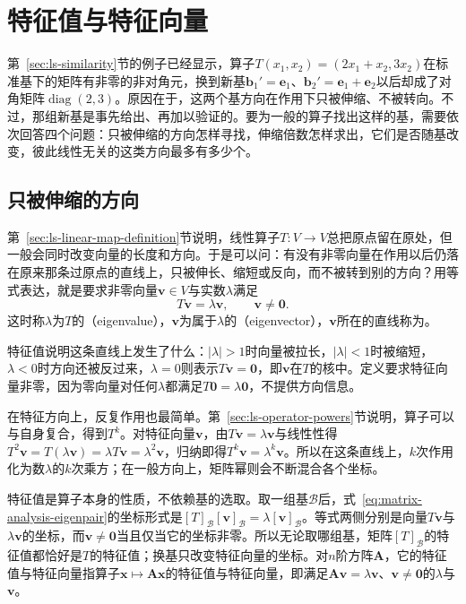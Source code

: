
\section{特征值与特征向量}
\label{sec:ls-linear-operators}

第~\ref{sec:ls-similarity}节的例子已经显示，算子$T(x_1,x_2)=(2x_1+x_2,3x_2)$在标准基下的矩阵有非零的非对角元，换到新基$\bm b_1'=\bm e_1$、$\bm b_2'=\bm e_1+\bm e_2$以后却成了对角矩阵$\operatorname{diag}(2,3)$。原因在于，这两个基方向在作用下只被伸缩、不被转向。不过，那组新基是事先给出、再加以验证的。要为一般的算子找出这样的基，需要依次回答四个问题：只被伸缩的方向怎样寻找，伸缩倍数怎样求出，它们是否随基改变，彼此线性无关的这类方向最多有多少个。

\subsection{只被伸缩的方向}
\label{sec:ls-operator-eigenvectors}

第~\ref{sec:ls-linear-map-definition}节说明，线性算子$T:V\to V$总把原点留在原处，但一般会同时改变向量的长度和方向。于是可以问：有没有非零向量在作用以后仍落在原来那条过原点的直线上，只被伸长、缩短或反向，而不被转到别的方向？用等式表达，就是要求非零向量$\bm v\in V$与实数$\lambda$满足
\begin{equation}
 T\bm v=\lambda\bm v,\qquad \bm v\neq\bm0.
 \label{eq:matrix-analysis-eigenpair}
\end{equation}
这时称$\lambda$为$T$的（eigenvalue），$\bm v$为属于$\lambda$的（eigenvector），$\bm v$所在的直线称为。

特征值说明这条直线上发生了什么：$|\lambda|>1$时向量被拉长，$|\lambda|<1$时被缩短，$\lambda<0$时方向还被反过来，$\lambda=0$则表示$T\bm v=\bm0$，即$\bm v$在$T$的核中。定义要求特征向量非零，因为零向量对任何$\lambda$都满足$T\bm0=\lambda\bm0$，不提供方向信息。

在特征方向上，反复作用也最简单。第~\ref{sec:ls-operator-powers}节说明，算子可以与自身复合，得到$T^k$。对特征向量$\bm v$，由$T\bm v=\lambda\bm v$与线性性得$T^2\bm v=T(\lambda\bm v)=\lambda T\bm v=\lambda^2\bm v$，归纳即得$T^k\bm v=\lambda^k\bm v$。所以在这条直线上，$k$次作用化为数$\lambda$的$k$次乘方；在一般方向上，矩阵幂则会不断混合各个坐标。

特征值是算子本身的性质，不依赖基的选取。取一组基$\mathcal B$后，式~\eqref{eq:matrix-analysis-eigenpair}的坐标形式是$[T]_{\mathcal B}[\bm v]_{\mathcal B}=\lambda[\bm v]_{\mathcal B}$。等式两侧分别是向量$T\bm v$与$\lambda\bm v$的坐标，而$\bm v\neq\bm0$当且仅当它的坐标非零。所以无论取哪组基，矩阵$[T]_{\mathcal B}$的特征值都恰好是$T$的特征值；换基只改变特征向量的坐标。对$n$阶方阵$\bm A$，它的特征值与特征向量指算子$\bm x\mapsto\bm A\bm x$的特征值与特征向量，即满足$\bm A\bm v=\lambda\bm v$、$\bm v\neq\bm0$的$\lambda$与$\bm v$。

